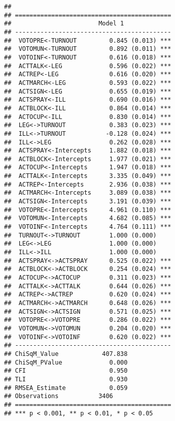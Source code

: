 \documentclass[
]{article}
\begin{document}
\begin{verbatim}
## 
## ===========================================
##                        Model 1             
## -------------------------------------------
##  VOTOPRE<-TURNOUT         0.845 (0.013) ***
##  VOTOMUN<-TURNOUT         0.892 (0.011) ***
##  VOTOINF<-TURNOUT         0.616 (0.018) ***
##  ACTTALK<-LEG             0.596 (0.022) ***
##  ACTREP<-LEG              0.616 (0.020) ***
##  ACTMARCH<-LEG            0.593 (0.022) ***
##  ACTSIGN<-LEG             0.655 (0.019) ***
##  ACTSPRAY<-ILL            0.690 (0.016) ***
##  ACTBLOCK<-ILL            0.864 (0.014) ***
##  ACTOCUP<-ILL             0.830 (0.014) ***
##  LEG<->TURNOUT            0.383 (0.023) ***
##  ILL<->TURNOUT           -0.128 (0.024) ***
##  ILL<->LEG                0.262 (0.028) ***
##  ACTSPRAY<-Intercepts     1.882 (0.018) ***
##  ACTBLOCK<-Intercepts     1.977 (0.021) ***
##  ACTOCUP<-Intercepts      1.947 (0.018) ***
##  ACTTALK<-Intercepts      3.335 (0.049) ***
##  ACTREP<-Intercepts       2.936 (0.038) ***
##  ACTMARCH<-Intercepts     3.089 (0.038) ***
##  ACTSIGN<-Intercepts      3.191 (0.039) ***
##  VOTOPRE<-Intercepts      4.961 (0.110) ***
##  VOTOMUN<-Intercepts      4.682 (0.085) ***
##  VOTOINF<-Intercepts      4.764 (0.111) ***
##  TURNOUT<->TURNOUT        1.000 (0.000)    
##  LEG<->LEG                1.000 (0.000)    
##  ILL<->ILL                1.000 (0.000)    
##  ACTSPRAY<->ACTSPRAY      0.525 (0.022) ***
##  ACTBLOCK<->ACTBLOCK      0.254 (0.024) ***
##  ACTOCUP<->ACTOCUP        0.311 (0.023) ***
##  ACTTALK<->ACTTALK        0.644 (0.026) ***
##  ACTREP<->ACTREP          0.620 (0.024) ***
##  ACTMARCH<->ACTMARCH      0.648 (0.026) ***
##  ACTSIGN<->ACTSIGN        0.571 (0.025) ***
##  VOTOPRE<->VOTOPRE        0.286 (0.022) ***
##  VOTOMUN<->VOTOMUN        0.204 (0.020) ***
##  VOTOINF<->VOTOINF        0.620 (0.022) ***
## -------------------------------------------
## ChiSqM_Value            407.838            
## ChiSqM_PValue             0.000            
## CFI                       0.950            
## TLI                       0.930            
## RMSEA_Estimate            0.059            
## Observations           3406                
## ===========================================
## *** p < 0.001, ** p < 0.01, * p < 0.05
\end{verbatim}
\end{document}
